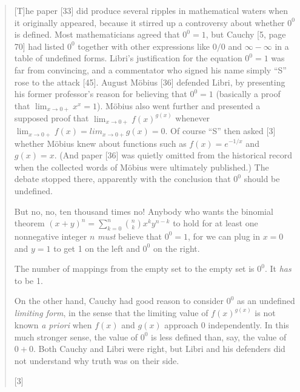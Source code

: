 \begin{quote}
    [T]he paper [33] did produce several ripples in mathematical
waters when
    it originally appeared, because it stirred up a controversy about whether
    $0^0$ is defined.  Most mathematicians agreed that $0^0 = 1$, but Cauchy 
[5, page 70] had listed $0^0$ together with other expressions like $0/0$ and
    $\infty-\infty$ in a table of undefined forms.  Libri's
justification for
    the equation $0^0 = 1$ was far from convincing, and a commentator
who signed
    his name simply ``S'' rose to the attack [45].  August M\"obius
[36]
    defended Libri, by presenting his former professor's reason for
believing
    that $0^0 = 1$ (basically a proof that $\lim_{x\rightarrow 0+} x^x
= 1$).  M\"obius also
    went further and presented a supposed proof that
$\lim_{x\rightarrow 0+} f(x)^{g(x)}$
    whenever $\lim_{x\rightarrow 0+} f(x) = lim_{x\rightarrow 0+} g(x)
= 0$.  Of
 course ``S'' then
    asked [3] whether M\"obius knew about functions such as $f(x) = e^{-1/x}$
    and $g(x) = x$.  (And paper [36] was quietly omitted from the historical
    record when the collected words of M\"obius were ultimately published.)
    The debate stopped there, apparently with the conclusion that $0^0$ should
    be undefined.

    But no, no, ten thousand times no!  Anybody who wants the binomial theorem
            $ (x+y)^n = \sum_{k=0}^n {n\choose k} x^k y^{n-k}$
    to hold for at least one nonnegative integer $n$ {\it must} believe that
    $0^0 = 1$, for we can plug in $x = 0$ and $y = 1$ to get 1 on the left and
$0^0$ on
    the right.

    The number of mappings from the empty set to the empty set is $0^0$.
    It {\it has} to be 1.

    On the other hand, Cauchy had good reason to consider $0^0$ as an undefined
    {\it limiting form}, in the sense that the limiting value of $f(x)^{g(x)}$ is
    not known {\it a priori} when $f(x)$ and $g(x)$ approach 0 independently.  In
    this much stronger sense, the value of $0^0$ is less defined than, say, the
    value of $0+0$.  Both Cauchy and Libri were right, but Libri and his
    defenders did not understand why truth was on their side.

    [3] 


\end{quote}
